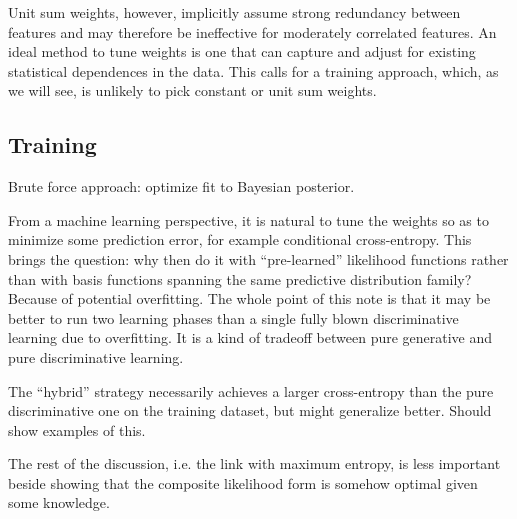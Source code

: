 \documentclass[english]{scrartcl}
\begin{document}
Unit sum weights, however, implicitly assume strong redundancy between features and may therefore be ineffective for moderately correlated features. An ideal method to tune weights is one that can capture and adjust for existing statistical dependences in the data. This calls for a training approach, which, as we will see, is unlikely to pick constant or unit sum weights.






\subsection{Training}

Brute force approach: optimize fit to Bayesian posterior.

From a machine learning perspective, it is natural to tune the weights so as to minimize some prediction error, for example conditional cross-entropy. This brings the question: why then do it with ``pre-learned'' likelihood functions rather than with basis functions spanning the same predictive distribution family? Because of potential overfitting. The whole point of this note is that it may be better to run two learning phases than a single fully blown discriminative learning due to overfitting. It is a kind of tradeoff between pure generative and pure discriminative learning. 

The ``hybrid'' strategy necessarily achieves a larger cross-entropy than the pure discriminative one on the training dataset, but might generalize better. Should show examples of this. 

The rest of the discussion, i.e. the link with maximum entropy, is less important beside showing that the composite likelihood form is somehow optimal given some knowledge. 


\end{document}

